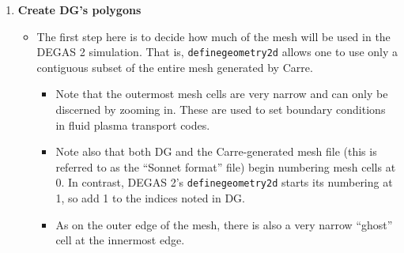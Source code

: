 \documentclass[12pt]{report}
\begin{document}
\begin{enumerate}
\begin{itemize}
\begin{itemize}
\verb+lns nstx_25+
    \end{itemize}
    \item Run Carre
    \begin{itemize}
      \item Change to the Carre directory with the alias \verb+cdcarre+
      \item On the command line, type: \\ \verb+carre -+
      \item If all goes well, one can use the default response (in 
parentheses) to each of Carre's queries and ``y'' to the yes / no questions.
      \item Make a note of the number of the file containing the resulting
grid.  This will be stored in DG's run directory.
    \end{itemize}
    \item Load mesh into DG with the 
\textbf{\texttt{File \begin{math}\vert{}\end{math} Import \begin{math}\vert{}\end{math} Mesh}} dialog.
    \item Note that this dialog box initially looks for files ending in 
\verb+.sno+.  Replace this \verb+*.sno+ with "*" and click the 
\textbf{\texttt{Filter}} button.
  \end{itemize}
  \item {\bf Create DG's polygons}
  \begin{itemize}
    \item The first step here is to decide how much of the mesh will be used in
the DEGAS 2 simulation.  That is, {\tt definegeometry2d} allows one
to use only a contiguous subset of the entire mesh generated by Carre.
    \begin{itemize}
      \item Note that the outermost mesh cells are very narrow and can
only be discerned by zooming in.  These are used to set boundary
conditions in fluid plasma transport codes.
      \item Note also that both DG and the Carre-generated mesh file 
(this is referred to as the ``Sonnet format'' file) 
begin numbering mesh cells at 0.  In contrast, DEGAS 2's 
{\tt definegeometry2d} 
starts its numbering at 1, so add 1 to the indices noted in DG.
      \item As on the outer edge of the mesh, 
there is also a very narrow ``ghost'' cell at the
innermost edge.
    \end{itemize}

\end{itemize}
\end{enumerate}
\end{document}
